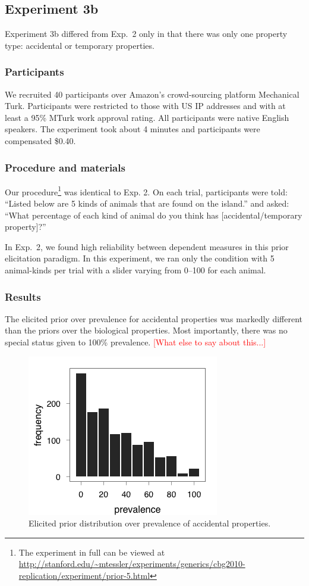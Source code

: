 \documentclass[10pt,letterpaper]{article}
\newcommand{\red}[1]{\textcolor{Red}{#1}}
\begin{document}
\subsection{Experiment 3b}

Experiment 3b differed from Exp.~2 only in that there was only one property type: accidental or temporary properties. 

\subsubsection{Participants}

We recruited 40 participants over Amazon's crowd-sourcing platform Mechanical Turk. Participants were restricted to those with US IP addresses and with at least a 95\% MTurk work approval rating. All participants were native English speakers. The experiment took about 4 minutes and participants were compensated \$0.40.

\subsubsection{Procedure and materials}

Our procedure\footnote{The experiment in full can be viewed at \url{http://stanford.edu/~mtessler/experiments/generics/cbg2010-replication/experiment/prior-5.html}} was identical to Exp. 2. On each trial, participants were told: ``Listed below are 5 kinds of animals that are found on the island.'' and asked: ``What percentage of each kind of animal do you think has [accidental/temporary property]?'' 

In Exp.~2, we found high reliability between dependent measures in this prior elicitation paradigm. In this experiment, we ran only the condition with 5 animal-kinds per trial with a slider varying from 0--100 for each animal.


\subsubsection{Results}

The elicited prior over prevalence for accidental properties was markedly different than the priors over the biological properties. Most importantly, there was no special status given to 100\% prevalence. \red{[What else to say about this...]}


\begin{figure}
\centering
    \includegraphics[width=0.5\columnwidth]{accidental_priors}
    \caption{Elicited prior distribution over prevalence of accidental properties.}
  \label{fig:accidentalpriors}
\end{figure}
\end{document}
